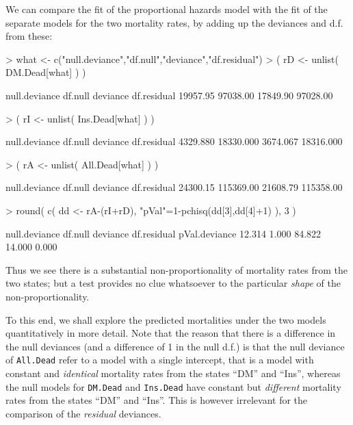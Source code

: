 \documentclass[a4paper,twoside,12pt]{report}
\begin{document}
We can compare the fit of the proportional hazards model with the fit
of the separate models for the two mortality rates, by adding up the
deviances and d.f. from these:
\begin{Schunk}
\begin{Sinput}
> what <- c("null.deviance","df.null","deviance","df.residual")
> ( rD <- unlist(  DM.Dead[what] ) )
\end{Sinput}
\begin{Soutput}
null.deviance       df.null      deviance   df.residual 
     19957.95      97038.00      17849.90      97028.00 
\end{Soutput}
\begin{Sinput}
> ( rI <- unlist( Ins.Dead[what] ) )
\end{Sinput}
\begin{Soutput}
null.deviance       df.null      deviance   df.residual 
     4329.880     18330.000      3674.067     18316.000 
\end{Soutput}
\begin{Sinput}
> ( rA <- unlist( All.Dead[what] ) )
\end{Sinput}
\begin{Soutput}
null.deviance       df.null      deviance   df.residual 
     24300.15     115369.00      21608.79     115358.00 
\end{Soutput}
\begin{Sinput}
> round( c( dd <- rA-(rI+rD), "pVal"=1-pchisq(dd[3],dd[4]+1) ), 3 )
\end{Sinput}
\begin{Soutput}
null.deviance       df.null      deviance   df.residual pVal.deviance 
       12.314         1.000        84.822        14.000         0.000 
\end{Soutput}
\end{Schunk}
Thus we see there is a substantial non-proportionality of mortality
rates from the two states; but a test provides no clue whatsoever to
the particular \emph{shape} of the non-proportionality.

To this end, we shall explore the predicted mortalities under the two
models quantitatively in more detail. Note that the reason that there
is a difference in the null deviances (and a difference of 1 in the
null d.f.) is that the null deviance of \texttt{All.Dead} refer to a
model with a single intercept, that is a model with constant and
\emph{identical} mortality rates from the states ``DM'' and ``Ins'',
whereas the null models for \texttt{DM.Dead} and \texttt{Ins.Dead}
have constant but \emph{different} mortality rates from the states
``DM'' and ``Ins''.  This is however irrelevant for the comparison of
the \emph{residual} deviances.
\end{document}
